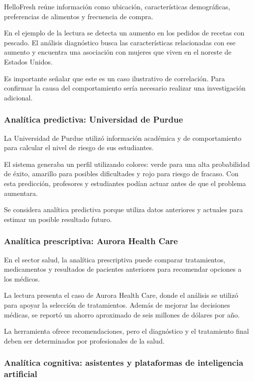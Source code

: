 HelloFresh reúne información como ubicación, características demográficas,
preferencias de alimentos y frecuencia de compra.

En el ejemplo de la lectura se detecta un aumento en los pedidos de recetas con
pescado. El análisis diagnóstico busca las características relacionadas con
ese aumento y encuentra una asociación con mujeres que viven en el noreste de
Estados Unidos.

Es importante señalar que este es un caso ilustrativo de correlación. Para
confirmar la causa del comportamiento sería necesario realizar una
investigación adicional.

\subsubsection*{Analítica predictiva: Universidad de Purdue}

La Universidad de Purdue utilizó información académica y de comportamiento
para calcular el nivel de riesgo de sus estudiantes.

El sistema generaba un perfil utilizando colores: verde para una alta
probabilidad de éxito, amarillo para posibles dificultades y rojo para riesgo
de fracaso. Con esta predicción, profesores y estudiantes podían actuar antes
de que el problema aumentara.

Se considera analítica predictiva porque utiliza datos anteriores y actuales
para estimar un posible resultado futuro.

\subsubsection*{Analítica prescriptiva: Aurora Health Care}

En el sector salud, la analítica prescriptiva puede comparar tratamientos,
medicamentos y resultados de pacientes anteriores para recomendar opciones a
los médicos.

La lectura presenta el caso de Aurora Health Care, donde el análisis se utilizó
para apoyar la selección de tratamientos. Además de mejorar las decisiones
médicas, se reportó un ahorro aproximado de seis millones de dólares por año.

La herramienta ofrece recomendaciones, pero el diagnóstico y el tratamiento
final deben ser determinados por profesionales de la salud.

\subsubsection*{Analítica cognitiva: asistentes y plataformas de inteligencia artificial}

